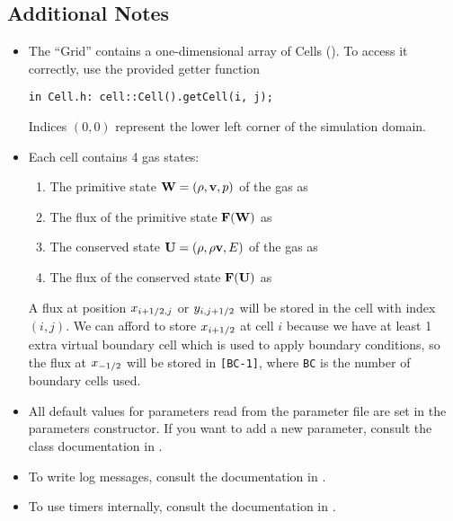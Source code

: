 \subsection{Additional Notes}


\begin{itemize}
\item The ``Grid'' contains a one-dimensional array of Cells
(). To access it correctly, use the provided getter
function
%
\begin{lstlisting}
in Cell.h: cell::Cell().getCell(i, j);
\end{lstlisting}
%
Indices $(0, 0)$ represent the lower left corner of the simulation domain.


\item Each cell contains 4 gas states:

\begin{enumerate}
\item The primitive state $\mathbf{W} = (\rho, \mathbf{v}, p)$ of the gas as 
\item The flux of the primitive state $\mathbf{F}(\mathbf{W})$ as 
\item The conserved state $\mathbf{U} = (\rho, \rho \mathbf{v}, E)$ of the gas as 
\item The flux of the conserved state $\mathbf{F}(\mathbf{U})$ as 
\end{enumerate}

A flux at position $x_{i+1/2, j}$ or $y_{i, j+1/2}$ will be stored in the
cell with index $(i, j)$.
We can afford to store $x_{i+1/2}$ at cell $i$ because we have at least 1
extra virtual boundary cell which is used to apply boundary conditions, so the
flux at $x_{-1/2}$ will be stored in \verb|[BC-1]|, where \texttt{BC} is
the number of boundary cells used.


\item All default values for parameters read from the parameter file are set in
the parameters constructor. If you want to add a new parameter, consult the
class documentation in .

\item To write log messages, consult the documentation in .

\item To use timers internally, consult the documentation in .

\end{itemize}
